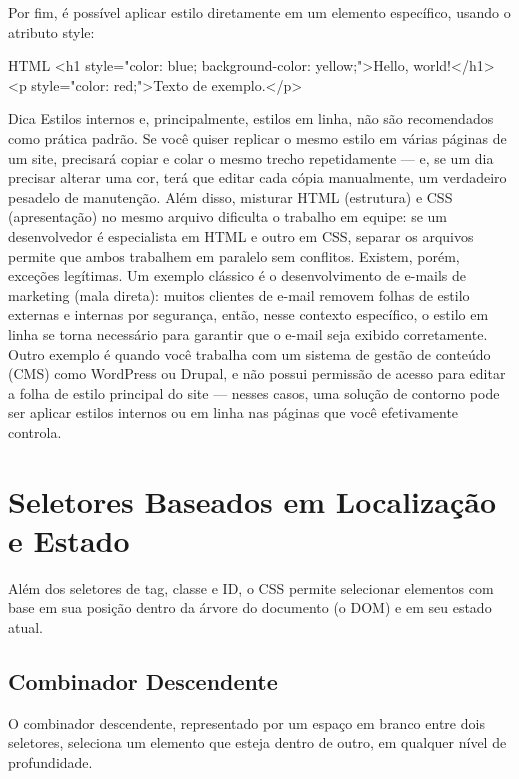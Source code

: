Por fim, é possível aplicar estilo diretamente em um elemento específico, usando o atributo style:

\begin{codebox}{HTML}
<h1 style="color: blue; background-color: yellow;">Hello, world!</h1>
<p style="color: red;">Texto de exemplo.</p>
\end{codebox}

\begin{infobox}{Dica}
Estilos internos e, principalmente, estilos em linha, não são recomendados como prática padrão. Se você quiser replicar o mesmo estilo em várias páginas de um site, precisará copiar e colar o mesmo trecho repetidamente — e, se um dia precisar alterar uma cor, terá que editar cada cópia manualmente, um verdadeiro pesadelo de manutenção. Além disso, misturar HTML (estrutura) e CSS (apresentação) no mesmo arquivo dificulta o trabalho em equipe: se um desenvolvedor é especialista em HTML e outro em CSS, separar os arquivos permite que ambos trabalhem em paralelo sem conflitos. Existem, porém, exceções legítimas. Um exemplo clássico é o desenvolvimento de e-mails de marketing (mala direta): muitos clientes de e-mail removem folhas de estilo externas e internas por segurança, então, nesse contexto específico, o estilo em linha se torna necessário para garantir que o e-mail seja exibido corretamente. Outro exemplo é quando você trabalha com um sistema de gestão de conteúdo (CMS) como WordPress ou Drupal, e não possui permissão de acesso para editar a folha de estilo principal do site — nesses casos, uma solução de contorno pode ser aplicar estilos internos ou em linha nas páginas que você efetivamente controla.
\end{infobox}

\section{Seletores Baseados em Localização e Estado}

Além dos seletores de tag, classe e ID, o CSS permite selecionar elementos com base em sua posição dentro da árvore do documento (o DOM) e em seu estado atual.

\subsection{Combinador Descendente}

O combinador descendente, representado por um espaço em branco entre dois seletores, seleciona um elemento que esteja dentro de outro, em qualquer nível de profundidade.

